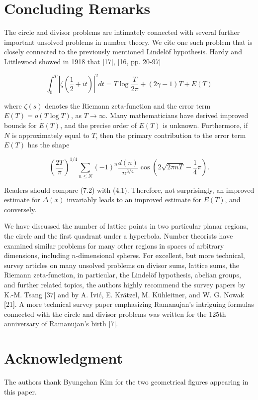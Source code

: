 \documentclass[10pt]{article}
\theoremstyle{plain}
\begin{document}
\section{Concluding Remarks}

The circle and divisor problems are intimately connected with several further important unsolved problems in number theory. We cite one such problem that is closely connected to the previously mentioned Lindelöf hypothesis. Hardy and Littlewood showed in 1918 that [17], [16, pp. 20-97]


\begin{equation*}
\int_{0}^{T}\left|\zeta\left(\frac{1}{2}+i t\right)\right|^{2} d t=T \log \frac{T}{2 \pi}+(2 \gamma-1) T+E(T) \tag{7.1}
\end{equation*}


where $\zeta(s)$ denotes the Riemann zeta-function and the error term $E(T)=o(T \log T)$, as $T \to \infty$. Many mathematicians have derived improved bounds for $E(T)$, and the precise order of $E(T)$ is unknown. Furthermore, if $N$ is approximately equal to $T$, then the primary contribution to the error term $E(T)$ has the shape


\begin{equation*}
\left(\frac{2 T}{\pi}\right)^{1 / 4} \sum_{n \leq N}(-1)^{n} \frac{d(n)}{n^{3 / 4}} \cos \left(2 \sqrt{2 \pi n T}-\frac{1}{4} \pi\right) . \tag{7.2}
\end{equation*}


Readers should compare (7.2) with (4.1). Therefore, not surprisingly, an improved estimate for $\Delta(x)$ invariably leads to an improved estimate for $E(T)$, and conversely.

We have discussed the number of lattice points in two particular planar regions, the circle and the first quadrant under a hyperbola. Number theorists have examined similar problems for many other regions in spaces of arbitrary dimensions, including $n$-dimensional spheres. For excellent, but more technical, survey articles on many unsolved problems on divisor sums, lattice sums, the Riemann zeta-function, in particular, the Lindelöf hypothesis, abelian groups, and further related topics, the authors highly recommend the survey papers by K.-M. Tsang [37] and by A. Ivić, E. Krätzel, M. Kühleitner, and W. G. Nowak [21]. A more technical survey paper emphasizing Ramanujan's intriguing formulas connected with the circle and divisor problems was written for the 125th anniversary of Ramanujan's birth [7].

\section*{Acknowledgment}
The authors thank Byungchan Kim for the two geometrical figures appearing in this paper.
\end{document}
